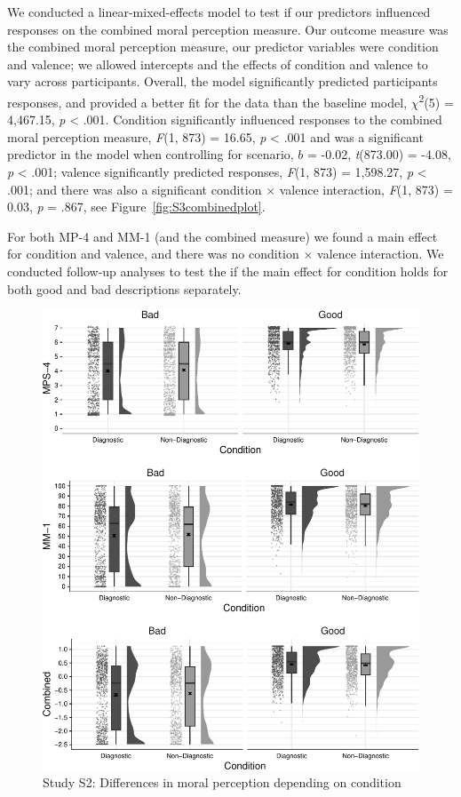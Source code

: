 \documentclass[
  man,floatsintext]{apa6}
\begin{document}
We conducted a linear-mixed-effects model to test if our predictors influenced responses on the combined moral perception measure. Our outcome measure was the combined moral perception measure, our predictor variables were condition and valence; we allowed intercepts and the effects of condition and valence to vary across participants.
Overall, the model significantly predicted participants responses, and provided a better fit for the data than the baseline model,
\(\chi\)\textsuperscript{2}(5) = 4,467.15, \emph{p} \textless{} .001.
Condition significantly influenced responses to the combined moral perception measure,
\emph{F}(1, 873) = 16.65, \emph{p} \textless{} .001
and was a significant predictor in the model when controlling for scenario, \(b\) = -0.02, \emph{t}(873.00) = -4.08, \emph{p} \textless{} .001;
valence significantly predicted responses,
\emph{F}(1, 873) = 1,598.27, \emph{p} \textless{} .001;
and there was also a significant condition \(\times\) valence interaction,
\emph{F}(1, 873) = 0.03, \emph{p} = .867, see Figure~\ref{fig:S3combinedplot}.

For both MP-4 and MM-1 (and the combined measure) we found a main effect for condition and valence, and there was no condition \(\times\) valence interaction. We conducted follow-up analyses to test the if the main effect for condition holds for both good and bad descriptions separately.

\begin{figure}[!h]
\includegraphics[width=\textwidth,]{Supplementary_files/figure-latex/StudyS2bothconditionplot-1} \caption{Study S2: Differences in moral perception depending on condition}\label{fig:StudyS2bothconditionplot}
\end{figure}
\end{document}
